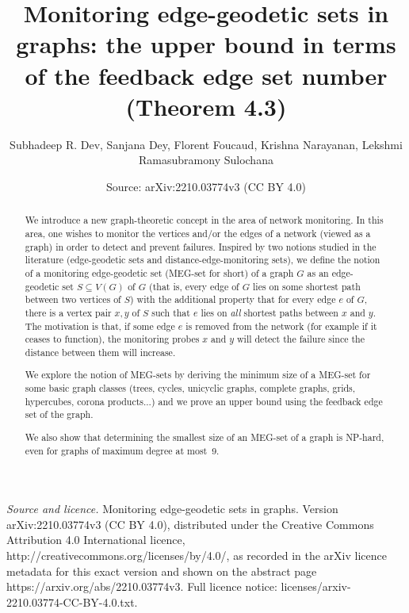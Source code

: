 \documentclass[10pt,a4paper]{amsart}
\title[The bound in terms of the feedback edge set number]{Monitoring edge-geodetic sets in graphs: the upper bound in terms of the feedback edge set number (Theorem 4.3)}
\author{Subhadeep R. Dev, Sanjana Dey, Florent Foucaud, Krishna Narayanan, Lekshmi Ramasubramony Sulochana}
\date{Source: arXiv:2210.03774v3 (CC BY 4.0)}
\theoremstyle{plain}
\theoremstyle{definition}
\begin{document}
\maketitle
\begin{abstract}
We introduce a new graph-theoretic concept in the area of network monitoring. In this area, one wishes to monitor the vertices and/or the edges of a network (viewed as a graph) in order to detect and prevent failures. Inspired by two notions studied in the literature (edge-geodetic sets and distance-edge-monitoring sets), we define the notion of a monitoring edge-geodetic set (MEG-set for short) of a graph $G$ as an edge-geodetic set $S\subseteq V(G)$ of $G$ (that is, every edge of $G$ lies on some shortest path between two vertices of $S$) with the additional property that for every edge $e$ of $G$, there is a vertex pair $x, y$ of $S$ such that $e$ lies on \emph{all} shortest paths between $x$ and $y$. The motivation is that, if some edge $e$ is removed from the network (for example if it ceases to function), the monitoring probes $x$ and $y$ will detect the failure since the distance between them will increase.

We explore the notion of MEG-sets by deriving the minimum size of a MEG-set for some basic graph classes (trees, cycles, unicyclic graphs, complete graphs, grids, hypercubes, corona products...) and we prove an upper bound using the feedback edge set of the graph.

We also show that determining the smallest size of an MEG-set of a graph is NP-hard, even for graphs of maximum degree at most~9.
\end{abstract}


\noindent\emph{Source and licence.} Monitoring edge-geodetic sets in graphs. Version arXiv:2210.03774v3 (CC BY 4.0), distributed under the Creative Commons Attribution 4.0 International licence, http://creativecommons.org/licenses/by/4.0/, as recorded in the arXiv licence metadata for this exact version and shown on the abstract page https://arxiv.org/abs/2210.03774v3. Full licence notice: licenses/arxiv-2210.03774-CC-BY-4.0.txt.\par\smallskip
\end{document}
